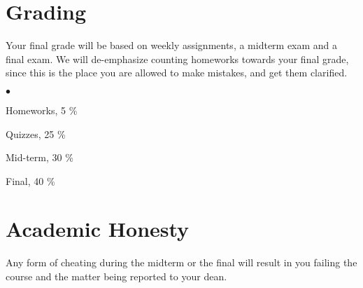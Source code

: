 \documentclass[margin,line]{res}
\newenvironment{list2}{
  \begin{list}{$\bullet$}{%
      \setlength{\itemsep}{0in}
      \setlength{\parsep}{0in} \setlength{\parskip}{0in}
      \setlength{\topsep}{0in} \setlength{\partopsep}{0in}
      \setlength{\leftmargin}{0.2in}}}{\end{list}}
\begin{document}
\begin{resume}
\section{\sc Grading}
Your final grade will be based on weekly assignments, a midterm exam and a final exam. We will de-emphasize counting homeworks towards your final grade, since this is the place you are allowed to make mistakes, and get them clarified.
\\

\begin{list2}
\item Homeworks, 5 \%
\item Quizzes, 25 \%
\item Mid-term, 30 \%
\item Final, 40 \%
\end{list2}

\section{\sc Academic Honesty} Any form of
cheating during the midterm or the final will result in you failing the
course and the matter being reported to your dean.

\end{resume}
\end{document}
